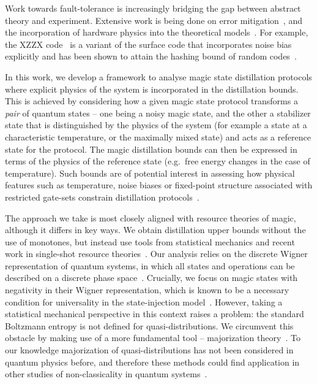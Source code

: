 \documentclass[pra,
aps,
twocolumn,
superscriptaddress,
groupedaddress,
nofootinbib,
reprint
]{revtex4-1}
\begin{document}
Work towards fault-tolerance is increasingly bridging the gap between abstract theory and experiment. Extensive work is being done on error mitigation~\cite{jones_2012, Li_2017, Temme_2017, Endo_2018, McClean_2017}, and the incorporation of hardware physics into the theoretical models~\cite{Kandala_2019, holmes_resource_2019, Colless_2018, song2018quantum, Bravyi_2021}. For example, the XZZX code~\cite{bonilla_ataides_xzzx_2021} is a variant of the surface code that incorporates noise bias explicitly and has been shown to attain the hashing bound of random codes~\cite{Bennett_1996}. 

In this work, we develop a framework to analyse magic state distillation protocols where explicit physics of the system is incorporated in the distillation bounds. This is achieved by considering how a given magic state protocol transforms a \emph{pair} of quantum states -- one being a noisy magic state, and the other a stabilizer state that is distinguished by the physics of the system (for example a state at a characteristic temperature, or the maximally mixed state) and acts as a reference state for the protocol. The magic distillation bounds can then be expressed in terms of the physics of the reference state (e.g.~free energy changes in the case of temperature). Such bounds are of potential interest in assessing how physical features such as temperature, noise biases or fixed-point structure associated with restricted gate-sets constrain distillation protocols~\cite{Tuckett_2019, Aliferis_2008, Stephens_2013, Li_2015, Babbush_2018, Guillaud_2019, Fowler_2019}.

The approach we take is most closely aligned with resource theories of magic, although it differs in key ways. We obtain distillation upper bounds without the use of monotones, but instead use tools from statistical mechanics and recent work in single-shot resource theories~\cite{cit:janzing, cit:horodecki2013, Brandao_2015, Vinjanampathy_2016, Goold_2016, cit:lostaglio, cit:gour}. Our analysis relies on the discrete Wigner representation of quantum systems, in which all states and operations can be described on a discrete phase space~\cite{Ferrie_2008, Okay_2021}. Crucially, we focus on magic states with negativity in their Wigner representation, which is known to be a necessary condition for universality in the state-injection model~\cite{cit:veitch, cit:mari, cit:gottesman, cit:knill, Campbell_2011}. However, taking a statistical mechanical perspective in this context raises a problem: the standard Boltzmann entropy is not defined for quasi-distributions. We circumvent this obstacle by making use of a more fundamental tool -- majorization theory~\cite{cit:marshall, Veinott_1971, Ruch_1976}. To our knowledge majorization of quasi-distributions has not been considered in quantum physics before, and therefore these methods could find application in other studies of non-classicality in quantum systems~\cite{Fine_1982, Allahverdyan_2018, arvidsson_2020, halpern_2018, Lostaglio_2018, Levy_2020}.
\end{document}
